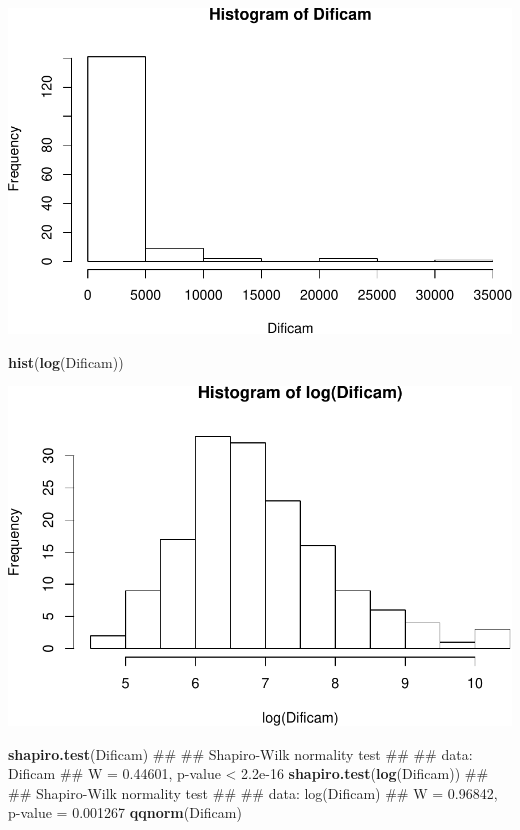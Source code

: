 \documentclass[11pt,]{article}
\newenvironment{Shaded}{\begin{snugshade}}{\end{snugshade}}
\newcommand{\KeywordTok}[1]{\textcolor[rgb]{0.13,0.29,0.53}{\textbf{#1}}}
\newcommand{\NormalTok}[1]{#1}
\begin{document}
\includegraphics[width=1\linewidth]{img/unnamed-chunk-3-1}

\begin{Shaded}
\begin{Highlighting}[]
\KeywordTok{hist}\NormalTok{(}\KeywordTok{log}\NormalTok{(Dificam))}
\end{Highlighting}
\end{Shaded}

\includegraphics[width=1\linewidth]{img/unnamed-chunk-3-2}

\begin{Shaded}
\begin{Highlighting}[]
\KeywordTok{shapiro.test}\NormalTok{(Dificam)}
\NormalTok{## }
\NormalTok{##  Shapiro-Wilk normality test}
\NormalTok{## }
\NormalTok{## data:  Dificam}
\NormalTok{## W = 0.44601, p-value < 2.2e-16}
\KeywordTok{shapiro.test}\NormalTok{(}\KeywordTok{log}\NormalTok{(Dificam))}
\NormalTok{## }
\NormalTok{##  Shapiro-Wilk normality test}
\NormalTok{## }
\NormalTok{## data:  log(Dificam)}
\NormalTok{## W = 0.96842, p-value = 0.001267}
\KeywordTok{qqnorm}\NormalTok{(Dificam)}
\end{Highlighting}
\end{Shaded}
\end{document}
